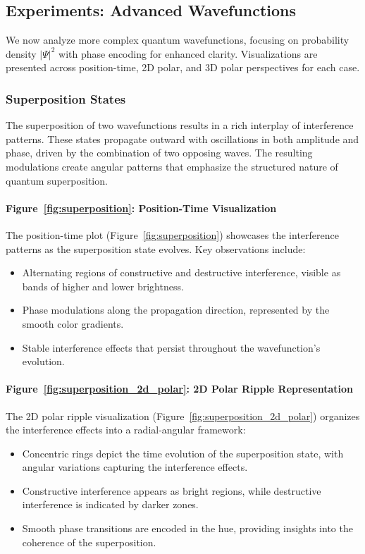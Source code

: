 \documentclass[12pt]{article}
\begin{document}
\subsection{Experiments: Advanced Wavefunctions}
We now analyze more complex quantum wavefunctions, focusing on probability density \(|\Psi|^2\) with phase encoding for enhanced clarity. Visualizations are presented across position-time, 2D polar, and 3D polar perspectives for each case.

\subsubsection{Superposition States}
The superposition of two wavefunctions results in a rich interplay of interference patterns. These states propagate outward with oscillations in both amplitude and phase, driven by the combination of two opposing waves. The resulting modulations create angular patterns that emphasize the structured nature of quantum superposition.

\paragraph{Figure~\ref{fig:superposition}: Position-Time Visualization}
The position-time plot (Figure~\ref{fig:superposition}) showcases the interference patterns as the superposition state evolves. Key observations include:
\begin{itemize}
    \item Alternating regions of constructive and destructive interference, visible as bands of higher and lower brightness.
    \item Phase modulations along the propagation direction, represented by the smooth color gradients.
    \item Stable interference effects that persist throughout the wavefunction's evolution.
\end{itemize}

\paragraph{Figure~\ref{fig:superposition_2d_polar}: 2D Polar Ripple Representation}
The 2D polar ripple visualization (Figure~\ref{fig:superposition_2d_polar}) organizes the interference effects into a radial-angular framework:
\begin{itemize}
    \item Concentric rings depict the time evolution of the superposition state, with angular variations capturing the interference effects.
    \item Constructive interference appears as bright regions, while destructive interference is indicated by darker zones.
    \item Smooth phase transitions are encoded in the hue, providing insights into the coherence of the superposition.
\end{itemize}
\end{document}
